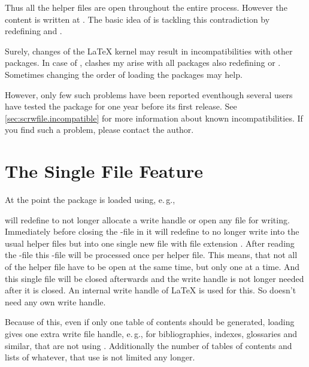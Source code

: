 Thus all the helper files are open throughout the entire process. However the
content is written at . The basic idea of
 is tackling this contradiction by redefining
 and .

Surely, changes of the \LaTeX{} kernel may
result in incompatibilities with other packages. In case of
, clashes my arise with all packages also redefining
 or . Sometimes changing the order of
loading the packages may help.

However, only few such problems have been reported eventhough several users
have tested the package for one year before its first release. See
\autoref{sec:scrwfile.incompatible} for more information about known
incompatibilities. If you find such a problem, please contact the
\KOMAScript{} author.

\section{The Single File Feature}

At the point the package is loaded using, e.\,g.,
\begin{lstcode}
  \usepackage{scrwfile}
\end{lstcode}
 will redefine  to not
longer allocate a write handle or open any file for writing. Immediately before
closing the -file in  it will
redefine  to no longer write into the usual helper files
but into one single new file with file extension . After
reading the -file this -file will be processed once per
helper file. This means, that not all of the helper file have to be open at
the same time, but only one at a time. And this single file will be closed
afterwards and the write handle is not longer needed after it is closed. An
internal write handle of \LaTeX{} is used for this. So 
doesn't need any own write handle.

Because of this, even if only one table of contents should be generated, 
loading  gives one extra write file handle,
e.\,g., for bibliographies, indexes, glossaries and similar, that are not
using . Additionally the number of tables of contents and
lists of whatever, that use  is not
limited any longer.

